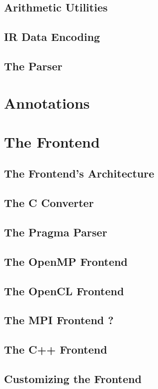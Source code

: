\subsection{Arithmetic Utilities}
\subsection{IR Data Encoding}
\subsection{The Parser}

\section{Annotations}

\section{The Frontend}
\subsection{The Frontend's Architecture}
\subsection{The C Converter}
\subsection{The Pragma Parser}
\subsection{The OpenMP Frontend}
\subsection{The OpenCL Frontend}
\subsection{The MPI Frontend ?}
\subsection{The C++ Frontend}
\subsection{Customizing the Frontend}

